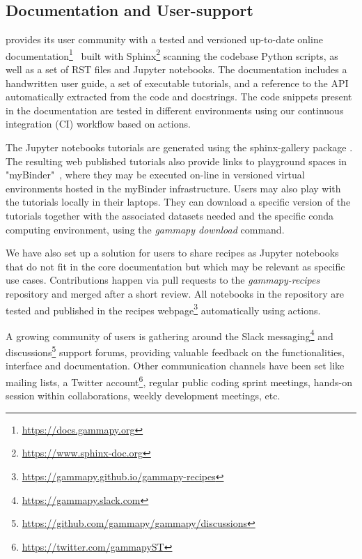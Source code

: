 \documentclass[traditabstract, longauth]{aa}
\begin{document}
\subsection{Documentation and User-support}
\label{ssec:documentation-and-user-support}
\gammapy provides its user community with a tested and versioned up-to-date
online
documentation\footnote{\url{https://docs.gammapy.org}}~\citep{2019ASPC..523..357B}
built with Sphinx\footnote{\url{https://www.sphinx-doc.org}} scanning the
codebase Python scripts, as well as a set of RST files and Jupyter notebooks.
The documentation includes a handwritten user guide, a set of executable
tutorials, and a reference to the API automatically extracted from the code and
docstrings. The \gammapy code snippets present in the documentation are tested
in different environments using our continuous integration (CI) workflow based
on \github actions.

The Jupyter notebooks tutorials are generated using the sphinx-gallery
package \citep{sphinx-gallery}.
The resulting web published tutorials also provide links to playground spaces in
"myBinder"~\citep{project_jupyter-proc-scipy-2018}, where they may be executed
on-line in versioned virtual environments hosted in the myBinder
infrastructure. Users may also play with the tutorials locally in their
laptops. They can download a specific version of the tutorials together with
the associated datasets needed and the specific conda computing environment,
using the \textit{gammapy download} command.

We have also set up a solution for users to share recipes as Jupyter notebooks
that do not fit in the \gammapy core documentation but which may be relevant as
specific use cases. Contributions happen via pull requests to the
\textit{gammapy-recipes} \github repository and merged after a short review. All
notebooks in the repository are tested and published in the \gammapy recipes
webpage\footnote{\url{https://gammapy.github.io/gammapy-recipes}} automatically
using \github actions.

A growing community of users is gathering around the Slack
messaging\footnote{\url{https://gammapy.slack.com}} and \github
discussions\footnote{\url{https://github.com/gammapy/gammapy/discussions}}
support forums, providing valuable feedback on the \gammapy functionalities,
interface and documentation. Other communication channels have been set like
mailing lists, a Twitter account\footnote{\url{https://twitter.com/gammapyST}},
regular public coding sprint meetings, hands-on session within collaborations,
weekly development meetings, etc.
\end{document}
